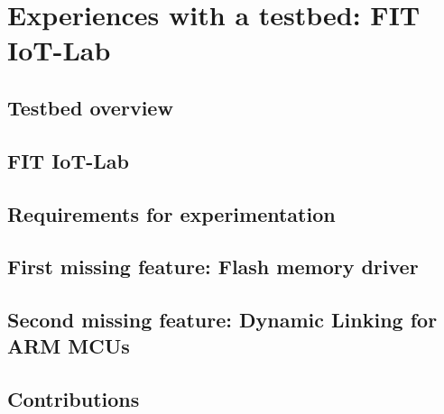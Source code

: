 \chapter{Experiences with a testbed: FIT IoT-Lab}
\label{sec:IoTLab}

\section{Testbed overview}

\section{FIT IoT-Lab}

\section{Requirements for experimentation}

\section{First missing feature: Flash memory driver}

\section{Second missing feature: Dynamic Linking for ARM MCUs}

\section{Contributions}